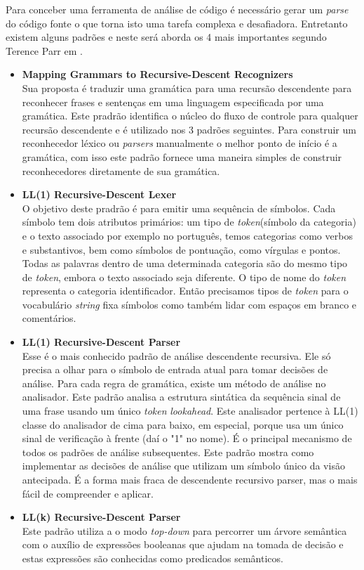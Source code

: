 Para conceber uma ferramenta de análise de código é necessário gerar um \textit{parse} do código fonte o que torna isto uma tarefa complexa e desafiadora. Entretanto existem alguns padrões e neste será aborda os 4 mais importantes segundo Terence Parr em \cite{Parr:2009:LIP:1823613}.
\begin{itemize}
	\item \textbf{Mapping Grammars to Recursive-Descent Recognizers}\\
	Sua proposta é traduzir uma gramática para uma recursão descendente para reconhecer frases e sentenças em uma linguagem especificada por uma gramática. Este pradrão identifica o núcleo do fluxo de controle para qualquer recursão descendente e é utilizado nos 3 padrões seguintes. 
	Para construir um reconhecedor léxico ou \textit{parsers} manualmente o melhor ponto de início é a gramática, com isso este padrão fornece uma maneira simples de construir reconhecedores diretamente de sua gramática.
	
	\item \textbf{LL(1) Recursive-Descent Lexer}\\
	O objetivo deste pradrão é para emitir uma sequência de símbolos. Cada símbolo tem dois atributos primários: um tipo de \textit{token}(símbolo da categoria) e o texto associado por exemplo 
	no português, temos categorias como verbos e substantivos, bem como símbolos de pontuação, como vírgulas e pontos. Todas as palavras dentro de uma determinada categoria são do mesmo tipo de \textit{token}, embora o texto associado seja diferente. O tipo de nome do \textit{token} representa o categoria identificador. Então precisamos tipos de \textit{token} para o vocabulário \textit{string} fixa símbolos como também lidar com espaços em branco e comentários.
	\item \textbf{LL(1) Recursive-Descent Parser}\\
	Esse é o mais conhecido padrão de análise descendente recursiva. Ele só precisa	a olhar para o símbolo de entrada atual para tomar decisões de análise. Para cada regra de gramática, existe um método de análise no analisador. Este padrão analisa a estrutura sintática da sequência sinal de uma frase usando um único \textit{token} \textit{lookahead}. Este analisador pertence à LL(1) classe do analisador de cima para baixo, em especial, porque usa um único sinal de verificação à frente (daí o "1" no nome). É o principal mecanismo de todos os padrões de análise subsequentes. Este padrão mostra como implementar as decisões de análise que utilizam um símbolo único da visão antecipada. É a forma mais fraca de descendente recursivo parser, mas o mais fácil de compreender e aplicar.
	\item \textbf{LL(k) Recursive-Descent Parser}\\
	Este padrão utiliza a o modo \textit{top-down} para percorrer um árvore semântica com o auxílio de expressões booleanas que ajudam na tomada de decisão e estas expressões são conhecidas como predicados semânticos.
	
\end{itemize}


%
